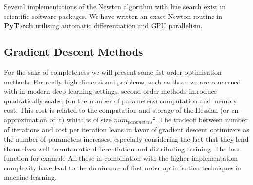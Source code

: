 \documentclass[11pt]{report}
\begin{document}
    Several implementations of the Newton algorithm with line search exist in scientific software packages.
    We have written an exact Newton routine in \textbf{PyTorch} utilising automatic differentiation and GPU parallelism.

    \subsection{Gradient Descent Methods}
    For the sake of completeness we will present some fist order optimisation methods.
    For really high dimensional problems, such as those we are concerned with in modern deep learning settings, second
    order methods introduce quadratically scaled (on the number of parameters) computation and memory cost.
    This cost is related to the computation and storage of the Hessian (or an approximation of it) which is of size
    ${num_{parameters}}^2$.
    The tradeoff between number of iterations and cost per iteration leans in favor of gradient descent optimizers as
    the number of parameters increases, especially considering the fact that they lend themselves well to automatic
    differentiation and distributing training.
    The loss function for example
    All these in combination with the higher implementation complexity have lead to the dominance of first order
    optimisation techniques in machine learning.
\end{document}
